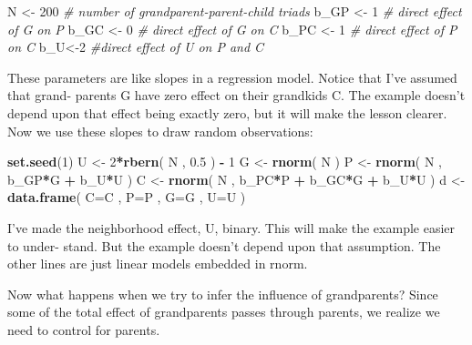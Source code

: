 \documentclass[
]{article}
\newenvironment{Shaded}{\begin{snugshade}}{\end{snugshade}}
\newcommand{\CommentTok}[1]{\textcolor[rgb]{0.56,0.35,0.01}{\textit{#1}}}
\newcommand{\DataTypeTok}[1]{\textcolor[rgb]{0.13,0.29,0.53}{#1}}
\newcommand{\DecValTok}[1]{\textcolor[rgb]{0.00,0.00,0.81}{#1}}
\newcommand{\FloatTok}[1]{\textcolor[rgb]{0.00,0.00,0.81}{#1}}
\newcommand{\KeywordTok}[1]{\textcolor[rgb]{0.13,0.29,0.53}{\textbf{#1}}}
\newcommand{\NormalTok}[1]{#1}
\newcommand{\OperatorTok}[1]{\textcolor[rgb]{0.81,0.36,0.00}{\textbf{#1}}}
\newcommand{\StringTok}[1]{\textcolor[rgb]{0.31,0.60,0.02}{#1}}
\begin{document}
\begin{Shaded}
\begin{Highlighting}[]
\NormalTok{N <-}\StringTok{ }\DecValTok{200} \CommentTok{# number of grandparent-parent-child triads }
\NormalTok{b_GP <-}\StringTok{ }\DecValTok{1} \CommentTok{# direct effect of G on P}
\NormalTok{b_GC <-}\StringTok{ }\DecValTok{0} \CommentTok{# direct effect of G on C}
\NormalTok{b_PC <-}\StringTok{ }\DecValTok{1} \CommentTok{# direct effect of P on C}
\NormalTok{b_U<-}\DecValTok{2} \CommentTok{#direct effect of U on P and C}
\end{Highlighting}
\end{Shaded}

These parameters are like slopes in a regression model. Notice that I've
assumed that grand- parents G have zero effect on their grandkids C. The
example doesn't depend upon that effect being exactly zero, but it will
make the lesson clearer. Now we use these slopes to draw random
observations:

\begin{Shaded}
\begin{Highlighting}[]
\KeywordTok{set.seed}\NormalTok{(}\DecValTok{1}\NormalTok{)}
\NormalTok{U <-}\StringTok{ }\DecValTok{2}\OperatorTok{*}\KeywordTok{rbern}\NormalTok{( N , }\FloatTok{0.5}\NormalTok{ ) }\OperatorTok{-}\StringTok{ }\DecValTok{1}
\NormalTok{G <-}\StringTok{ }\KeywordTok{rnorm}\NormalTok{( N )}
\NormalTok{P <-}\StringTok{ }\KeywordTok{rnorm}\NormalTok{( N , b_GP}\OperatorTok{*}\NormalTok{G }\OperatorTok{+}\StringTok{ }\NormalTok{b_U}\OperatorTok{*}\NormalTok{U )}
\NormalTok{C <-}\StringTok{ }\KeywordTok{rnorm}\NormalTok{( N , b_PC}\OperatorTok{*}\NormalTok{P }\OperatorTok{+}\StringTok{ }\NormalTok{b_GC}\OperatorTok{*}\NormalTok{G }\OperatorTok{+}\StringTok{ }\NormalTok{b_U}\OperatorTok{*}\NormalTok{U ) }
\NormalTok{d <-}\StringTok{ }\KeywordTok{data.frame}\NormalTok{( }\DataTypeTok{C=}\NormalTok{C , }\DataTypeTok{P=}\NormalTok{P , }\DataTypeTok{G=}\NormalTok{G , }\DataTypeTok{U=}\NormalTok{U )}
\end{Highlighting}
\end{Shaded}

I've made the neighborhood effect, U, binary. This will make the example
easier to under- stand. But the example doesn't depend upon that
assumption. The other lines are just linear models embedded in rnorm.

Now what happens when we try to infer the influence of grandparents?
Since some of the total effect of grandparents passes through parents,
we realize we need to control for parents.
\end{document}
